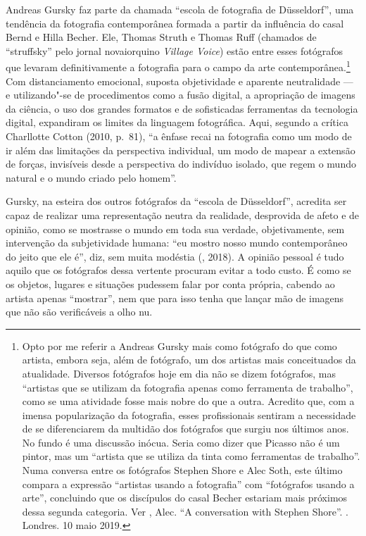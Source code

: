 Andreas Gursky faz parte da chamada ``escola de fotografia de
Düsseldorf'', uma tendência da fotografia contemporânea formada a partir
da influência do casal Bernd e Hilla Becher. Ele, Thomas Struth e Thomas
Ruff (chamados de ``struffsky'' pelo jornal novaiorquino \emph{Village
Voice}) estão entre esses fotógrafos que levaram definitivamente a
fotografia para o campo da arte contemporânea.\footnote{Opto por me \label{ferramenta}
  referir a Andreas Gursky mais como fotógrafo do que como artista,
  embora seja, além de fotógrafo, um dos artistas mais conceituados da
  atualidade. Diversos fotógrafos hoje em dia não se dizem fotógrafos,
  mas ``artistas que se utilizam da fotografia apenas como ferramenta de
  trabalho'', como se uma atividade fosse mais nobre do que a outra.
  Acredito que, com a imensa popularização da fotografia, esses
  profissionais sentiram a necessidade de se diferenciarem da multidão
  dos fotógrafos que surgiu nos últimos anos. No fundo é uma discussão
  inócua. Seria como dizer que Picasso não é um pintor, mas um ``artista
  que se utiliza da tinta como ferramentas de trabalho''. Numa conversa
  entre os fotógrafos Stephen Shore e Alec Soth, este último compara a
  expressão ``artistas usando a fotografia'' com ``fotógrafos usando a
  arte'', concluindo que os discípulos do casal Becher estariam mais
  próximos dessa segunda categoria. Ver , Alec. ``A conversation with
  Stephen Shore''. {}. Londres. 10 maio 2019.} Com
distanciamento emocional, suposta objetividade e aparente neutralidade
--- e utilizando"-se de procedimentos como a fusão digital, a apropriação
de imagens da ciência, o uso dos grandes formatos e de sofisticadas
ferramentas da tecnologia digital, expandiram os limites da linguagem
fotográfica. Aqui, segundo a crítica Charllotte Cotton (2010, p.~81),
``a ênfase recai na fotografia como um modo de ir além das limitações da
perspectiva individual, um modo de mapear a extensão de forças,
invisíveis desde a perspectiva do indivíduo isolado, que regem o mundo
natural e o mundo criado pelo homem''.

Gursky, na esteira dos outros fotógrafos da ``escola de Düsseldorf'',
acredita ser capaz de realizar uma representação neutra da realidade,
desprovida de afeto e de opinião, como se mostrasse o mundo em toda sua
verdade, objetivamente, sem intervenção da subjetividade humana: ``eu
mostro nosso mundo contemporâneo do jeito que ele é'', diz, sem muita
modéstia (, 2018). A opinião pessoal é tudo aquilo que os
fotógrafos dessa vertente procuram evitar a todo custo. É como se os
objetos, lugares e situações pudessem falar por conta própria, cabendo
ao artista apenas ``mostrar'', nem que para isso tenha que lançar mão de
imagens que não são verificáveis a olho nu.

